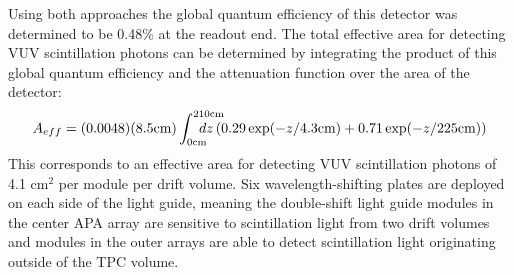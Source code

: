 Using both approaches the global quantum efficiency of this detector was determined to be 0.48\% at the readout end. The total effective area for detecting VUV scintillation photons can be determined by integrating the product of this global quantum efficiency and the attenuation function over the area of the detector:
\begin{equation*}
  A_{eff} = (0.0048) (8.5\text{cm}) \int_{0\text{cm}}^{210\text{cm}} \hspace{-2em}dz \left( 0.29 \exp(-z/4.3\text{cm}) + 0.71 \exp(-z/225\text{cm}) \right)
\end{equation*}
This corresponds to an effective area for detecting VUV scintillation photons of 4.1 cm$^{2}$ per module per drift volume. Six wavelength-shifting plates are deployed on each side of the light guide, meaning the double-shift light guide modules in the center APA array are sensitive to scintillation light from two drift volumes and modules in the outer arrays are able to detect scintillation light originating outside of the TPC volume.

%


